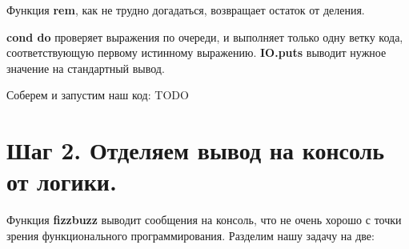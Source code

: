 Функция \textbf{rem}, как не трудно догадаться, возвращает остаток от деления.

\textbf{cond do} проверяет выражения по очереди, и выполняет только одну ветку кода, соответствующую первому истинному выражению. \textbf{IO.puts} выводит нужное значение на стандартный вывод.

Соберем и запустим наш код:
TODO


\section{Шаг 2. Отделяем вывод на консоль от логики.}

Функция \textbf{fizzbuzz} выводит сообщения на консоль, что не очень хорошо с точки зрения функционального программирования. Разделим нашу задачу на две:
